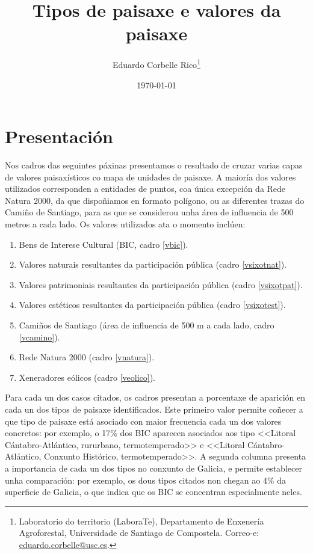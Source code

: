 \documentclass[11pt,a4paper]{article}
\title{Tipos de paisaxe e valores da paisaxe}
\author{Eduardo Corbelle Rico\thanks{Laboratorio do territorio (LaboraTe), Departamento de Enxener\'ia Agroforestal, Universidade de Santiago de Compostela. Correo-e: \href{mailto:eduardo.corbelle@usc.es}{eduardo.corbelle@usc.es}.}}
\date{\today}
\begin{document}
\maketitle




\section{Presentación}

Nos cadros das seguintes páxinas presentamos o resultado de cruzar varias capas de valores paisaxísticos co mapa de unidades de paisaxe. A maioría dos valores utilizados corresponden a entidades de puntos, coa única excepción da Rede Natura 2000, da que dispoñiamos en formato polígono, ou as diferentes trazas do Camiño de Santiago, para as que se considerou unha área de influencia de 500 metros a cada lado. Os valores utilizados ata o momento inclúen:

\begin{enumerate}
 \item Bens de Interese Cultural (BIC, cadro \ref{vbic}).
 \item Valores naturais resultantes da participación pública (cadro \ref{vsixotnat}).
 \item Valores patrimoniais resultantes da participación pública (cadro \ref{vsixotpat}).
 \item Valores estéticos resultantes da participación pública (cadro \ref{vsixotest}).
 \item Camiños de Santiago (área de influencia de 500 m a cada lado, cadro \ref{vcamino}).
 \item Rede Natura 2000 (cadro \ref{vnatura}).
 \item Xeneradores eólicos (cadro \ref{veolico}).
\end{enumerate}

Para cada un dos casos citados, os cadros presentan a porcentaxe de aparición en cada un dos tipos de paisaxe identificados. Este primeiro valor permite coñecer a que tipo de paisaxe está asociado con maior frecuencia cada un dos valores concretos: por exemplo, o 17\% dos BIC aparecen asociados aos tipo <<Litoral Cántabro-Atlántico, rururbano, termotemperado>> e <<Litoral Cántabro-Atlántico, Conxunto Histórico, termotemperado>>. A segunda columna presenta a importancia de cada un dos tipos no conxunto de Galicia, e permite establecer unha comparación: por exemplo, os dous tipos citados non chegan ao 4\% da superficie de Galicia, o que indica que os BIC se concentran especialmente neles.


\begin{landscape}
 \begin{footnotesize}














 
 \end{footnotesize}
\end{landscape}
\end{document}
